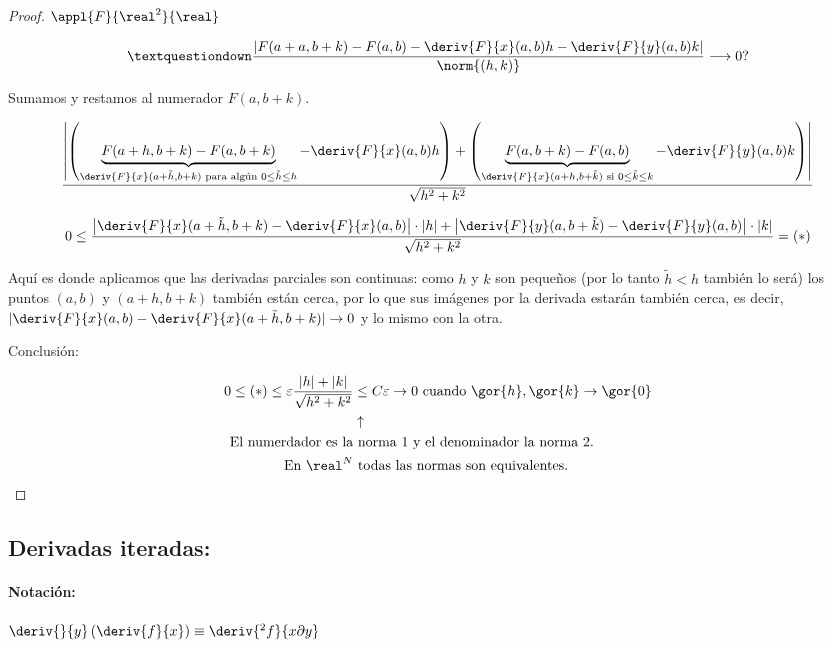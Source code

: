 \documentclass{apuntes}
\begin{document}
\begin{proof}
 $\appl{F}{\real^2}{\real}$
 
 $$¿\frac{\left|F(a+a,b+k) - F(a,b) - \deriv{F}{x}(a,b) h - \deriv{F}{y}(a,b)k\right|}{\norm{(h,k)}}\longrightarrow 0?$$
 
 Sumamos y restamos al numerador $F(a,b+k)$.
 
 $$\frac{\left|\left(\underbrace{F(a+h,b+k) - F(a,b+k)}_{\deriv{F}{x}(a+\tilde{h},b+k) \text{ para algún } 0 \leq\tilde{h}\leq h} -  \deriv{F}{x}(a,b) h\right) + \left(\underbrace{F(a,b+k) - F(a,b)}_{\deriv{F}{x}(a+h,b+\tilde{k}) \text{ si } 0 \leq\tilde{k}\leq k}- \deriv{F}{y}(a,b) k\right)\right|}{\sqrt{h^2+k^2}}$$

 $$0\leq\frac{\left|\deriv{F}{x}(a+\tilde{h},b+k)-\deriv{F}{x}(a,b)\right| \cdot |h| + \left| \deriv{F}{y}(a,b+\tilde{k}) - \deriv{F}{y}(a,b)\right| \cdot |k|}{\sqrt{h^2+k^2}} = (*)$$
 
 Aquí es donde aplicamos que las derivadas parciales son continuas: como $h$ y $k$ son pequeños (por lo tanto $\tilde{h}<h$ también lo será) los puntos $(a,b)$ y $(a+h,b+k)$ también están cerca, por lo que sus imágenes por la derivada estarán también cerca, es decir, $|\deriv{F}{x}(a,b)-\deriv{F}{x}(a+\tilde{h},b+k)| \rightarrow 0$ y lo mismo con la otra.
 
 Conclusión:
 
 \begin{align*}
0 \leq (*) \leq \varepsilon \frac{|h|+|k|}{\sqrt{h^2+k^2}} &\leq C\varepsilon \rightarrow 0 \text{ cuando } \gor{h},\gor{k} \rightarrow \gor{0}\\
&\uparrow\\
\text{El numerdador es la} & \text{ norma 1 y el denominador la norma 2.}\\
\text{En } \real^N &\text{ todas las normas son equivalentes.}  
 \end{align*}
 
 
\end{proof}


\subsection{Derivadas iteradas:}

\paragraph{Notación:}

$\deriv{}{y}\left(\deriv{f}{x}\right) \equiv \deriv{^2f}{x \partial y}$
\end{document}
